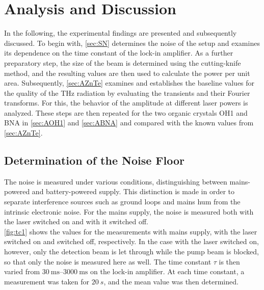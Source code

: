 \chapter{Analysis and Discussion}
\label{sec:aus}

In the following, the experimental findings are presented and subsequently discussed.
To begin with, \autoref{sec:SN} determines the noise of the setup and examines its dependence
on the time constant of the lock-in amplifier.
As a further preparatory step, the size of the beam is determined using the cutting-knife
method, and the resulting values are then used to calculate the power per unit area.
Subsequently, \autoref{sec:AZnTe} examines and establishes the baseline values for the quality
of the THz radiation by evaluating the transients and their Fourier transforms.
For this, the behavior of the amplitude at different laser powers is analyzed.
These steps are then repeated for the two organic crystals OH1 and BNA in \autoref{sec:AOH1}
and \autoref{sec:ABNA} and compared with the known values from \autoref{sec:AZnTe}.


\section{Determination of the Noise Floor}
\label{sec:SN}
The noise is measured under various conditions, distinguishing between mains-powered and
battery-powered supply.
This distinction is made in order to separate interference sources such as ground loops and
mains hum from the intrinsic electronic noise.
For the mains supply, the noise is measured both with the laser switched on and with it
switched off. \\





\autoref{fig:tc1} shows the values for the measurements with mains supply, with the laser
switched on and switched off, respectively.
In the case with the laser switched on, however, only the detection beam is let through while
the pump beam is blocked, so that only the noise is measured here as well.
The time constant $\tau$ is then varied from $\SIrange{30}{3000}{\milli\second}$ on the
lock-in amplifier.
At each time constant, a measurement was taken for $\SI{20}{s}$, and the mean value was then
determined.

